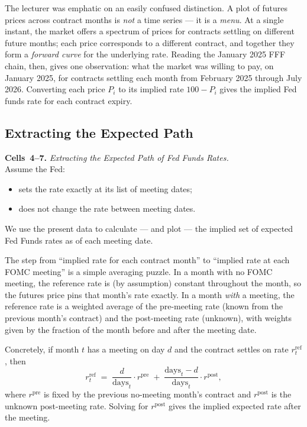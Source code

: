 The lecturer was emphatic on an easily confused distinction. A plot of
futures prices across contract months is \emph{not} a time series --- it
is a \emph{menu}. At a single instant, the market offers a spectrum of
prices for contracts settling on different future months; each price
corresponds to a different contract, and together they form a
\emph{forward curve} for the underlying rate. Reading the January 2025
FFF chain, then, gives one observation: what the market was willing to pay,
on January 2025, for contracts settling each month from February 2025
through July 2026. Converting each price $P_i$ to its implied rate
$100 - P_i$ gives the implied Fed funds rate for each contract expiry.

\subsection{Extracting the Expected Path}\label{L3-sec:infer-path}

\begin{keyblock}
\textbf{Cells~4--7.} \emph{Extracting the Expected Path of Fed Funds Rates.}\\
Assume the Fed:
\begin{itemize}
  \item sets the rate exactly at its list of meeting dates;
  \item does not change the rate between meeting dates.
\end{itemize}
We use the present data to calculate --- and plot --- the implied set of
expected Fed Funds rates as of each meeting date.
\end{keyblock}

The step from ``implied rate for each contract month'' to ``implied rate
at each FOMC meeting'' is a simple averaging puzzle. In a month with no
FOMC meeting, the reference rate is (by assumption) constant throughout
the month, so the futures price pins that month's rate exactly. In a month
\emph{with} a meeting, the reference rate is a weighted average of the
pre-meeting rate (known from the previous month's contract) and the
post-meeting rate (unknown), with weights given by the fraction of the
month before and after the meeting date.

Concretely, if month $t$ has a meeting on day $d$ and the contract settles
on rate $r^{\text{ref}}_t$, then
\[
  r^{\text{ref}}_t \;=\; \frac{d}{\text{days}_t} \cdot r^{\text{pre}} \;+\; \frac{\text{days}_t - d}{\text{days}_t} \cdot r^{\text{post}},
\]
where $r^{\text{pre}}$ is fixed by the previous no-meeting month's
contract and $r^{\text{post}}$ is the unknown post-meeting rate. Solving
for $r^{\text{post}}$ gives the implied expected rate after the meeting.

